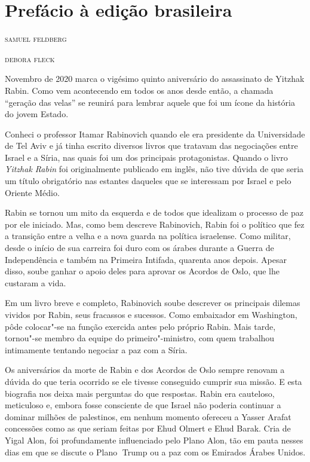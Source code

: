 \chapter{Prefácio à edição brasileira}

\begin{flushright}
\textsc{samuel feldberg}

\textsc{debora fleck}
\end{flushright}


\noindent{}Novembro de 2020 marca o vigésimo quinto aniversário do assassinato de
Yitzhak Rabin. Como vem acontecendo em todos os anos desde então, a
chamada ``geração das velas'' se reunirá para lembrar aquele que foi um
ícone da história do jovem Estado.

Conheci o professor Itamar Rabinovich quando ele era presidente da
Universidade de Tel Aviv e já tinha escrito diversos livros que tratavam
das negociações entre Israel e a Síria, nas quais foi um dos principais
protagonistas. Quando o livro \textit{Yitzhak Rabin} foi originalmente publicado 
em inglês, não tive dúvida de que
seria um título obrigatório nas estantes daqueles que se interessam por
Israel e pelo Oriente Médio.

Rabin se tornou um mito da esquerda e de todos que idealizam o processo
de paz por ele iniciado. Mas, como bem descreve Rabinovich, Rabin foi o
político que fez a transição entre a velha e a nova guarda na política
israelense. Como militar, desde o início de sua carreira foi duro com os
árabes durante a Guerra de Independência e também na Primeira Intifada,
quarenta anos depois. Apesar disso, soube ganhar o apoio deles para
aprovar os Acordos de Oslo, que lhe custaram a vida.

Em um livro breve e completo, Rabinovich soube descrever os principais
dilemas vividos por Rabin, seus fracassos e sucessos. Como embaixador em
Washington, pôde colocar"-se na função exercida antes pelo próprio Rabin.
Mais tarde, tornou"-se membro da equipe do
primeiro"-ministro, com quem trabalhou intimamente tentando negociar a paz
com a Síria.

Os aniversários da morte de Rabin e dos Acordos de Oslo sempre renovam a
dúvida do que teria ocorrido se ele tivesse conseguido cumprir sua
missão. E esta biografia nos deixa mais perguntas do que respostas.
Rabin era cauteloso, meticuloso e, embora fosse consciente de que Israel não poderia continuar a dominar milhões de palestinos, em nenhum momento ofereceu a Yasser Arafat concessões como as que seriam feitas por Ehud Olmert e Ehud Barak. Cria de Yigal Alon, foi profundamente influenciado pelo Plano Alon, tão em pauta nesses dias em que se discute o Plano 􏰃Trump ou a paz com os Emirados Árabes Unidos.

